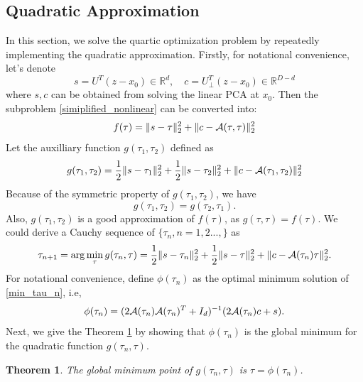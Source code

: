 \documentclass[aos,preprint]{imsart}
\newtheorem{theorem}{Theorem}[section]
\theoremstyle{remark}
\begin{document}
\subsection{Quadratic Approximation}
In this section, we solve the quartic optimization problem by repeatedly implementing the quadratic approximation.
Firstly, for notational convenience, let's denote 
\[
s = U^T (z-x_0)\in {\mathbb R}^{d}, \quad c = U^T_{\perp}(z-x_0)\in {\mathbb R}^{D-d}
\]
where $s, c$ can be obtained from solving the linear PCA at $x_0$. Then the subproblem \eqref{simiplified_nonlinear} can be converted into:
\begin{equation}\label{f_tau}
f(\tau) = \|s-\tau\|_2^2+\|c- {{\cal A}} (\tau,\tau)\|_2^2
\end{equation}
Let the auxilliary function $g(\tau_1,\tau_2)$ defined as
\[
g(\tau_1,\tau_2) =\frac{1}{2} \|s-\tau_1\|_2^2+\frac{1}{2} \|s-\tau_2\|_2^2+\|c- {\cal A} (\tau_1,\tau_2)\|_2^2
\]
Because of the symmetric property of $g(\tau_1,\tau_2)$, we have
\[
g(\tau_1,\tau_2) = g(\tau_2,\tau_1).
\]
Also, $g(\tau_1,\tau_2)$ is a good approximation of $f(\tau)$, as $g(\tau,\tau)=f(\tau)$. We could derive a Cauchy sequence of $\{\tau_n, n=1,2...,\}$ as 
\begin{equation}\label{min_tau_n}
\tau_{n+1} = \arg\min_{\tau}g(\tau_{n},\tau) = \frac{1}{2}\|s-\tau_{n}\|_2^2+\frac{1}{2}\|s-\tau\|_2^2+\|c-{\cal A}(\tau_{n})\tau\|_2^2.
\end{equation}
For notational convenience, define $\phi(\tau_{n})$ as the optimal minimum solution of \eqref{min_tau_n}, i.e,
\[
\phi(\tau_{n})=( 2{\cal A}(\tau_{n}){\cal A}(\tau_{n})^T+ I_d)^{-1} (2{\cal A}(\tau_{n})c+ s).
\]
Next, we give the Theorem \ref{global} by showing that $\phi(\tau_n)$ is the global minimum for the quadratic function $g(\tau_n,\tau)$.
\begin{theorem}\label{global}
The global minimum point of  $g(\tau_{n},\tau)$ is $\tau = \phi(\tau_{n})$.
\end{theorem}
\end{document}
